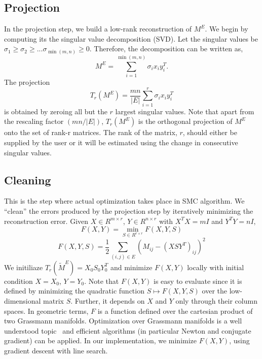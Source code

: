 \documentclass{article} %
\begin{document}
\subsection{Projection}
In the projection step, we build a low-rank reconstruction of $M^E$.
We begin by computing its the singular value decomposition (SVD). Let
the singular values be
$\sigma_1 \ge \sigma_2 \ge ... \sigma_{\min(m,n)} \ge 0$. Therefore,
the decomposition can be written as,
\begin{equation}
  M^E = \sum_{i=1}^{\min(m,n)} \sigma_ix_iy_i^T.
\end{equation}
The projection
\begin{equation}
  T_r(M^E) = \frac{mn}{|E|}\sum\limits_{i=1}^r \sigma_ix_iy_i^T
\end{equation}
is obtained by zeroing all but the $r$ largest singular values. Note
that apart from the rescaling factor $(mn/|E|)$, $T_r(M^E)$ is the
orthogonal projection of $M^E$ onto the set of rank-r matrices. The rank of the matrix, $r$, should either be supplied by the user or it will be estimated using the change in consecutive singular values.

\subsection{Cleaning}
This is the step where actual optimization takes place in SMC algorithm. We
``clean'' the errors produced by the projection step by iteratively
minimizing the reconstruction error. Given $X \in R^{m\times r}$,
$Y \in R^{n\times r}$ with $X^TX = mI$ and $Y^TY = nI$,
\begin{equation}
  F(X,Y) = \min_{S \in R^{r \times r}} F(X,Y,S)
\end{equation}
\begin{equation}
  F(X,Y,S) = \frac{1}{2} \sum\limits_{(i,j) \in E} (M_{ij} - (XSY^T)_{ij})^2
\end{equation}
We initiliaze $T_r(\widetilde{M}^E) = X_0S_0Y_0^T$ and minimize
$F(X, Y)$ locally with initial condition $X = X_0$, $Y = Y_0$. Note
that $F(X, Y)$ is easy to evaluate since it is defined by minimizing
the quadratic function $S \mapsto F(X, Y, S)$ over the low-dimensional
matrix $S$. Further, it depends on $X$ and $Y$ only through their
column spaces. In geometric terms, $F$ is a function defined over the
cartesian product of two Grassmann manifolds. Optimization over
Grassmann manifolds is a well understood
topic~\cite{edelman1998geometry} and efficient algorithms (in
particular Newton and conjugate gradient) can be applied. In our
implementation, we minimize $F(X, Y)$, using gradient descent with
line search.
\end{document}
